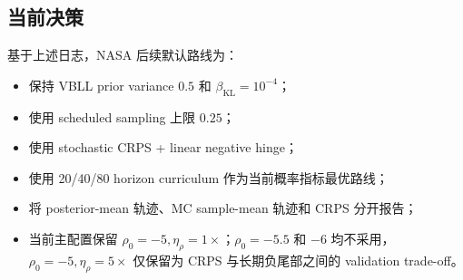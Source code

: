 \documentclass[11pt,a4paper,fontset=none]{ctexart}
\begin{document}
\subsection{当前决策}

基于上述日志，NASA 后续默认路线为：
\begin{itemize}
  \item 保持 VBLL prior variance $0.5$ 和 $\beta_{\mathrm{KL}}=10^{-4}$；
  \item 使用 scheduled sampling 上限 $0.25$；
  \item 使用 stochastic CRPS + linear negative hinge；
  \item 使用 20/40/80 horizon curriculum 作为当前概率指标最优路线；
  \item 将 posterior-mean 轨迹、MC sample-mean 轨迹和 CRPS 分开报告；
  \item 当前主配置保留 $\rho_0=-5,\eta_\rho=1\times$；$\rho_0=-5.5$ 和 $-6$ 均不采用，$\rho_0=-5,\eta_\rho=5\times$ 仅保留为 CRPS 与长期负尾部之间的 validation trade-off。
\end{itemize}
\end{document}
